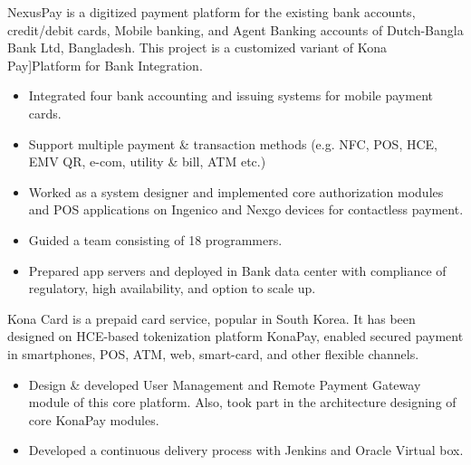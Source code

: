 \documentclass[10pt,a4paper,ragged2e]{altacv}
\begin{document}












    NexusPay is a digitized payment platform for the existing bank accounts, credit/debit cards, Mobile banking, and Agent
    Banking accounts of Dutch-Bangla Bank Ltd, Bangladesh. This project is a customized variant
    of Kona Pay]Platform for Bank Integration.

    \begin{itemize}
        \item Integrated four bank accounting and issuing systems for mobile payment cards.
        \item Support multiple payment & transaction methods (e.g. NFC, POS, HCE, EMV QR, e-com, utility & bill, ATM etc.)
        \item Worked as a system designer and implemented core authorization modules and POS applications on Ingenico and Nexgo devices for contactless payment.
        \item Guided a team consisting of 18 programmers.
        \item Prepared app servers and deployed in Bank data center with compliance of regulatory, high availability, and option to scale up.
    \end{itemize}








    Kona Card is a prepaid card service, popular in South Korea. It has been designed on HCE-based tokenization platform KonaPay, enabled secured payment in smartphones, POS, ATM, web, smart-card, and other flexible channels.
    \begin{itemize}
        \item Design & developed User Management and Remote Payment Gateway module of this core platform. Also, took part in the architecture designing of core KonaPay modules.
        \item Developed a continuous delivery process with Jenkins and Oracle Virtual box.
    \end{itemize}
\end{document}
